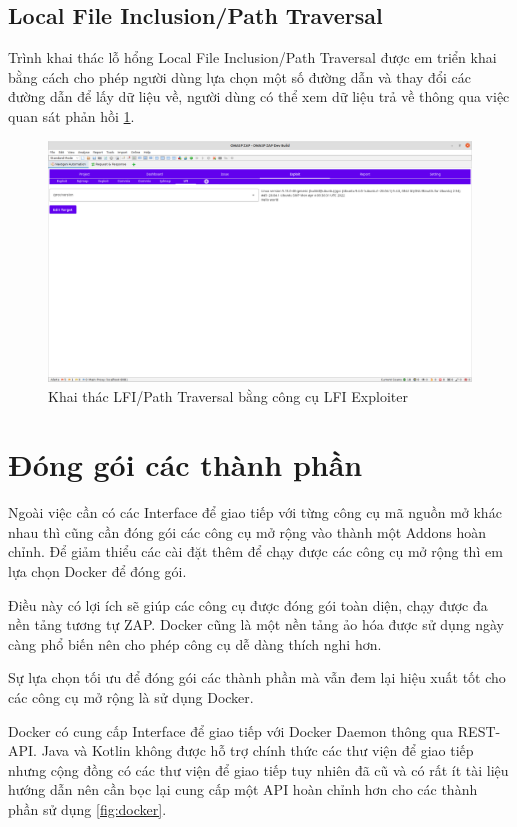 \documentclass[./../main.tex]{subfiles}
\begin{document}
\subsection{Local File Inclusion/Path Traversal}

Trình khai thác lỗ hổng Local File Inclusion/Path Traversal được
em triển khai bằng cách cho phép người dùng lựa chọn một số đường
dẫn và thay đổi các đường dẫn để lấy dữ liệu về, người dùng có thể
xem dữ liệu trả về thông qua việc quan sát phản hồi \ref{fig:lfi_exploit}.

\begin{figure}[ht!]
	\includegraphics[width=\linewidth]{./images/lfi_exploit.png}
	\caption{Khai thác LFI/Path Traversal bằng công cụ LFI Exploiter}
	\label{fig:lfi_exploit}
\end{figure}

\section{Đóng gói các thành phần}

Ngoài việc cần có các Interface để giao tiếp với từng công cụ mã nguồn
mở khác nhau thì cũng cần đóng gói các công cụ mở rộng vào thành một
Addons hoàn chỉnh. Để giảm thiểu các cài đặt thêm để chạy được các công
cụ mở rộng thì em lựa chọn Docker để đóng gói.

Điều này có lợi ích sẽ giúp các công cụ được đóng gói toàn diện, chạy
được đa nền tảng tương tự ZAP. Docker cũng là một nền tảng ảo hóa được
sử dụng ngày càng phổ biến nên cho phép công cụ dễ dàng thích nghi hơn.

Sự lựa chọn tối ưu để đóng gói các thành phần mà vẫn đem lại hiệu xuất
tốt cho các công cụ mở rộng là sử dụng Docker.

Docker có cung cấp Interface để giao tiếp với Docker Daemon thông qua
REST-API. Java và Kotlin không được hỗ trợ chính thức các thư viện để
giao tiếp nhưng cộng đồng có các thư viện để giao tiếp tuy nhiên đã cũ
và có rất ít tài liệu hướng dẫn nên cần bọc lại cung cấp một API hoàn
chỉnh hơn cho các thành phần sử dụng \ref{fig:docker}.
\end{document}

